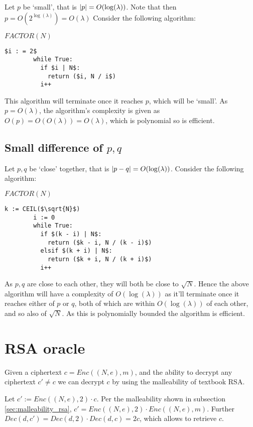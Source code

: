 \documentclass[a4paper]{scrreprt}
\DeclarePairedDelimiter\abs{\lvert}{\rvert}
\begin{document}
Let $p$ be `small', that is $\abs{p} = O(\log(\lambda))$. Note that then $p =
O(2^{\log(\lambda)}) = O(\lambda)$ Consider the following algorithm:

\begin{library}{$FACTOR(N)$}
	\begin{lstlisting}[mathescape=true,autogobble=true]
		$i : = 2$
		while True:
		  if $i | N$:
		    return ($i, N / i$)
		  i++
	\end{lstlisting}
\end{library}

This algorithm will terminate once it reaches $p$, which will be `small'. As $p
= O(\lambda)$, the algorithm's complexity is given as $O(p) = O(O(\lambda)) =
O(\lambda)$, which is polynomial so is efficient.

\subsection{Small difference of $p, q$}

Let $p, q$ be `close' together, that is $\abs{p - q} = O(\log(\lambda))$.
Consider the following algorithm:

\begin{library}{$FACTOR(N)$}
	\begin{lstlisting}[mathescape=true,autogobble=true]
		k := CEIL($\sqrt{N}$)
		i := 0
		while True:
		  if $(k - i) | N$:
		    return ($k - i, N / (k - i)$)
		  elsif $(k + i) | N$:
		    return ($k + i, N / (k + i)$)
		  i++
	\end{lstlisting}
\end{library}

As $p, q$ are close to each other, they will both be close to $\sqrt{N}$. Hence
the above algorithm will have a complexity of $O(\log(\lambda))$ as it'll
terminate once it reaches either of $p$ or $q$, both of which are within
$O(\log(\lambda))$ of each other, and so also of $\sqrt{N}$. As this is
polynomially bounded the algorithm is efficient.

\section{RSA oracle}

Given a ciphertext $c = Enc((N, e), m)$, and the ability to decrypt any
ciphertext $c' \neq c$ we can decrypt $c$ by using the malleability of textbook
RSA. 

Let $c' := Enc((N, e), 2) \cdot c$. Per the malleability shown in subsection
\ref{sec:malleability_rsa}, $c' = Enc((N, e), 2) \cdot Enc((N, e), m)$. Further
$Dec(d, c') = Dec(d, 2) \cdot Dec(d, c) = 2c$, which allows to retrieve $c$.
\end{document}
